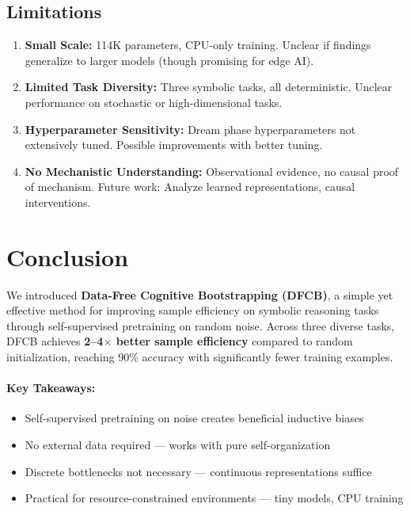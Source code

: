 \documentclass[11pt,twocolumn]{article}
\newcommand{\method}{DFCB}
\newcommand{\methodfull}{Data-Free Cognitive Bootstrapping}
\begin{document}
\subsection{Limitations}

\begin{enumerate}
    \item \textbf{Small Scale:} 114K parameters, CPU-only training. Unclear if findings generalize to larger models (though promising for edge AI).

    \item \textbf{Limited Task Diversity:} Three symbolic tasks, all deterministic. Unclear performance on stochastic or high-dimensional tasks.

    \item \textbf{Hyperparameter Sensitivity:} Dream phase hyperparameters not extensively tuned. Possible improvements with better tuning.

    \item \textbf{No Mechanistic Understanding:} Observational evidence, no causal proof of mechanism. Future work: Analyze learned representations, causal interventions.
\end{enumerate}

\section{Conclusion}

We introduced \textbf{\methodfull{} (\method{})}, a simple yet effective method for improving sample efficiency on symbolic reasoning tasks through self-supervised pretraining on random noise. Across three diverse tasks, \method{} achieves \textbf{2--4$\times$ better sample efficiency} compared to random initialization, reaching 90\% accuracy with significantly fewer training examples.

\paragraph{Key Takeaways:}
\begin{itemize}
    \item Self-supervised pretraining on noise creates beneficial inductive biases
    \item No external data required --- works with pure self-organization
    \item Discrete bottlenecks not necessary --- continuous representations suffice
    \item Practical for resource-constrained environments --- tiny models, CPU training
\end{itemize}
\end{document}

